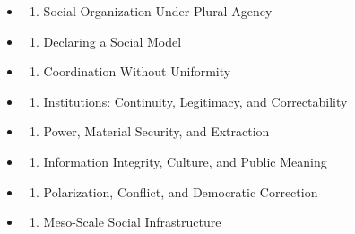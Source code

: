 \documentclass[
  11pt,
]{article}
\providecommand{\tightlist}{%
  \setlength{\itemsep}{0pt}\setlength{\parskip}{0pt}}
\begin{document}
\begin{itemize}
\tightlist
\item
  \begin{enumerate}
  \def\labelenumi{\arabic{enumi}.}
  \tightlist
  \item
    Social Organization Under Plural Agency
  \end{enumerate}
\item
  \begin{enumerate}
  \def\labelenumi{\arabic{enumi}.}
  \setcounter{enumi}{1}
  \tightlist
  \item
    Declaring a Social Model
  \end{enumerate}
\item
  \begin{enumerate}
  \def\labelenumi{\arabic{enumi}.}
  \setcounter{enumi}{2}
  \tightlist
  \item
    Coordination Without Uniformity
  \end{enumerate}
\item
  \begin{enumerate}
  \def\labelenumi{\arabic{enumi}.}
  \setcounter{enumi}{3}
  \tightlist
  \item
    Institutions: Continuity, Legitimacy, and Correctability
  \end{enumerate}
\item
  \begin{enumerate}
  \def\labelenumi{\arabic{enumi}.}
  \setcounter{enumi}{4}
  \tightlist
  \item
    Power, Material Security, and Extraction
  \end{enumerate}
\item
  \begin{enumerate}
  \def\labelenumi{\arabic{enumi}.}
  \setcounter{enumi}{5}
  \tightlist
  \item
    Information Integrity, Culture, and Public Meaning
  \end{enumerate}
\item
  \begin{enumerate}
  \def\labelenumi{\arabic{enumi}.}
  \setcounter{enumi}{6}
  \tightlist
  \item
    Polarization, Conflict, and Democratic Correction
  \end{enumerate}
\item
  \begin{enumerate}
  \def\labelenumi{\arabic{enumi}.}
  \setcounter{enumi}{7}
  \tightlist
  \item
    Meso-Scale Social Infrastructure

\end{enumerate}
\end{itemize}
\end{document}
